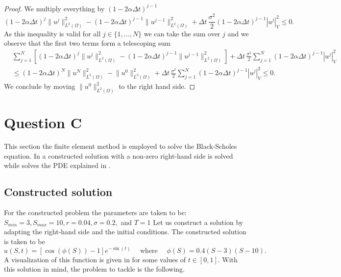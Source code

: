 \documentclass{article}
\newcommand{\sigmafrac}{\ensuremath{\frac{\sigma^2}{2}}}
\newcommand{\seminormsq}[1]{\ensuremath{|#1|_V^2}}
\newcommand{\normsq}[1]{\ensuremath{\|#1\|_{L^2(\Omega)}^2}}
\begin{document}
\begin{proof}
   We multiply everything by $(1- 2\alpha \Delta t)^{j-1}$
   \begin{equation*}
       (1- 2\alpha \Delta t)^{j}\normsq{u^{j}}  - (1- 2\alpha \Delta t)^{j-1} \normsq{u^{j-1}} + \Delta t \, \sigmafrac (1- 2\alpha \Delta t)^{j-1}\seminormsq{u^{j}} \leq 0.
   \end{equation*}
   As this inequality is valid for all $j \in \{1, \ldots, N \}$ we can take the sum over $j$ and we observe that the first two terms form a telescoping sum
   \begin{align*}
       &\sum_{j=1}^{N} \left[(1- 2\alpha \Delta t)^{j}\normsq{u^{j}}  - (1- 2\alpha \Delta t)^{j-1} \normsq{u^{j-1}}\right] + \Delta t \, \sigmafrac \sum_{j=1}^{N}(1- 2\alpha \Delta t)^{j-1}\seminormsq{u^{j}} \\
       &\leq (1- 2\alpha \Delta t)^{N}\normsq{u^{N}} - \normsq{u^{0}} + \Delta t \, \sigmafrac \sum_{j=1}^{N}(1- 2\alpha \Delta t)^{j-1}\seminormsq{u^{j}} \leq 0.
   \end{align*}
   We conclude by moving $\normsq{u^{0}}$ to the right hand side.\qedhere
\end{proof}



\section{Question C}
This section the finite element method is employed to solve the Black-Scholes equation. In  a constructed solution with a non-zero right-hand side is solved while  solves the PDE explained in . 
\subsection{Constructed solution}\label{sec:constructed_cos}
For the constructed problem the parameters are taken to be: $S_{min} = 3, S_{max}=10, r=0.04, \sigma = 0.2,$ and $T=1$ Let us construct a solution by adapting the right-hand side and the initial conditions. The constructed solution is taken to be
\begin{equation}\label{eq:constructed_cos}
    u(S,t)=\left[\cos\left(\phi(S)\right)-1\right]e^{-\sin(t)} \quad \text{ where } \quad \phi(S)=0.4(S-3)(S-10).
\end{equation}
A visualization of this function is given in  for some values of $t \in [0,1]$. With this solution in mind, the problem to tackle is the following.
\end{document}
